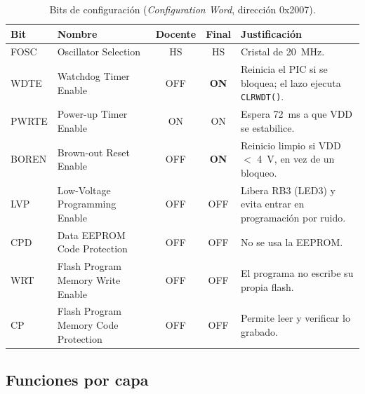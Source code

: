 \begin{table}[H]
  \centering
  \caption{Bits de configuración (\emph{Configuration Word}, dirección 0x2007).}
  \label{tab:config}
  \small
  \begin{tabularx}{\textwidth}{@{}l >{\raggedright\arraybackslash}p{4.1cm} c c L@{}}
    \toprule
    \textbf{Bit} & \textbf{Nombre} & \textbf{Docente} & \textbf{Final} & \textbf{Justificación} \\
    \midrule
    FOSC  & Oscillator Selection & HS & HS & Cristal de \SI{20}{\mega\hertz}. \\
    WDTE  & Watchdog Timer Enable & OFF & \textbf{ON} & Reinicia el PIC si se bloquea; el lazo ejecuta \texttt{CLRWDT()}. \\
    PWRTE & Power-up Timer Enable & ON & ON & Espera \SI{72}{\milli\second} a que VDD se estabilice. \\
    BOREN & Brown-out Reset Enable & OFF & \textbf{ON} & Reinicio limpio si VDD $<$ \SI{4}{\volt}, en vez de un bloqueo. \\
    LVP   & Low-Voltage Programming Enable & OFF & OFF & Libera RB3 (LED3) y evita entrar en programación por ruido. \\
    CPD   & Data EEPROM Code Protection & OFF & OFF & No se usa la EEPROM. \\
    WRT   & Flash Program Memory Write Enable & OFF & OFF & El programa no escribe su propia flash. \\
    CP    & Flash Program Memory Code Protection & OFF & OFF & Permite leer y verificar lo grabado. \\
    \bottomrule
  \end{tabularx}
\end{table}

\subsection{Funciones por capa}

